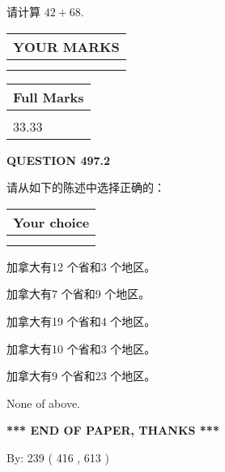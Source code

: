 \documentclass{ctexart}
\begin{document}
  
 
请计算 $ %
42 +  %
68 $.
 

 

 
  
\vspace{0.2in}
  
\noindent\begin{tabular}{|l|}
\hline
 YOUR MARKS  \\
\hline
 \\ 
 \\ 
\hline
\end{tabular}
\hspace{0.05in} \begin{tabular}{|l|}
\hline
 Full Marks  \\
\hline
 \\ 
33.33 \\
\hline
\end{tabular}
{\textbf{\Large{QUESTION
497.2 
}}}
  
  
请从如下的陈述中选择正确的：
  
  
\noindent\hspace{3.0in} \begin{tabular}{|l|}
\hline
Your choice \\
\hline
 \\ 
 \\ 
\hline
\end{tabular}
  
  
 
 
加拿大有12 个省和3 个地区。
 
 
加拿大有7 个省和9 个地区。
 
 
加拿大有19 个省和4 个地区。
 
 
加拿大有10 个省和3 个地区。
 
 
加拿大有9 个省和23 个地区。
 
 
 None of above.
 
 
   
   
 \vspace{0.2in}
 
   
   
   
   
\vspace{1.0in} 
{\textbf{\large{ *** END OF PAPER, THANKS *** }}} 
   
   
\hspace{1.0in} By: 
 239 ( 416 ,  613 )
   
\end{document}
